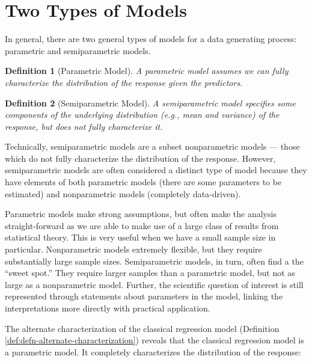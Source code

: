 \documentclass[
]{book}
\theoremstyle{plain}
\theoremstyle{mydefn}
\newtheorem{definition}{Definition}[chapter]
\theoremstyle{myexmpl}
\theoremstyle{remark}
\begin{document}
\hypertarget{two-types-of-models}{%
\section{Two Types of Models}\label{two-types-of-models}}

In general, there are two general types of models for a data generating process: parametric and semiparametric models.

\begin{definition}[Parametric Model]
A parametric model assumes we can \emph{fully} characterize the distribution of the response given the predictors.
\end{definition}

\begin{definition}[Semiparametric Model]
A semiparametric model specifies some components of the underlying distribution (e.g., mean and variance) of the response, but does not fully characterize it.
\end{definition}

\begin{rmdtip}
Technically, semiparametric models are a subset nonparametric models --- those which do not fully characterize the distribution of the response. However, semiparametric models are often considered a distinct type of model because they have elements of both parametric models (there are some parameters to be estimated) and nonparametric models (completely data-driven).
\end{rmdtip}

Parametric models make strong assumptions, but often make the analysis straight-forward as we are able to make use of a large class of results from statistical theory. This is very useful when we have a small sample size in particular. Nonparametric models extremely flexible, but they require substantially large sample sizes. Semiparametric models, in turn, often find a the ``sweet spot.'' They require larger samples than a parametric model, but not as large as a nonparametric model. Further, the scientific question of interest is still represented through statements about parameters in the model, linking the interpretations more directly with practical application.

The alternate characterization of the classical regression model (Definition \ref{def:defn-alternate-characterization}) reveals that the classical regression model is a parametric model. It completely characterizes the distribution of the response:
\end{document}
